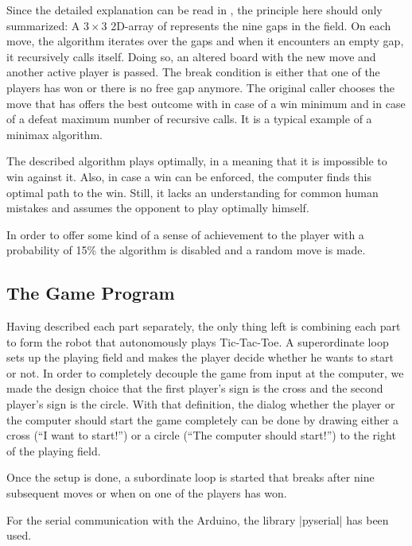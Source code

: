 \documentclass{sig-alternate-05-2015}
\begin{document}
Since the detailed explanation can be read in \cite{NSB}, the principle here should only summarized: A $3\times 3$ 2D-array of represents the nine gaps in the field. On each move, the algorithm iterates over the gaps and when it encounters an empty gap, it recursively calls itself. Doing so, an altered board with the new move and another active player is passed. The break condition is either that one of the players has won or there is no free gap anymore. The original caller chooses the move that has offers the best outcome with in case of a win minimum and in case of a defeat maximum number of recursive calls. It is a typical example of a minimax algorithm.

The described algorithm plays optimally, in a meaning that it is impossible to win against it. Also, in case a win can be enforced, the computer finds this optimal path to the win. Still, it lacks an understanding for common human mistakes and assumes the opponent to play optimally himself.

In order to offer some kind of a sense of achievement to the player with a probability of 15\% the algorithm is disabled and a random move is made.
\subsection{The Game Program}
Having described each part separately, the only thing left is combining each part to form the robot that autonomously plays Tic-Tac-Toe. A superordinate loop sets up the playing field and makes the player decide whether he wants to start or not. In order to completely decouple the game from input at the computer, we made the design choice that the first player's sign is the cross and the second player's sign is the circle. With that definition, the dialog whether the player or the computer should start the game completely can be done by drawing either a cross (``I want to start!'') or a circle (``The computer should start!'') to the right of the playing field.

Once the setup is done, a subordinate loop is started that breaks after nine subsequent moves or when on one of the players has won.

For the serial communication with the Arduino, the library |pyserial| \cite{PyS} has been used.


%
\end{document}
